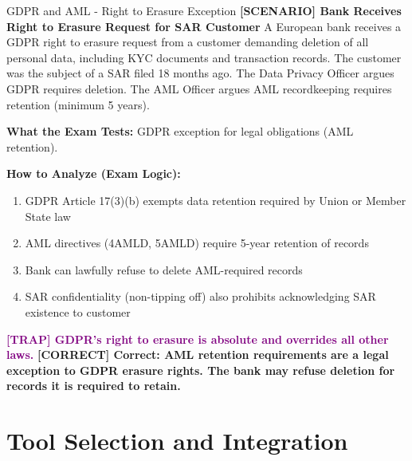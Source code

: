\documentclass[11pt,a4paper]{beamer}
\newcommand{\trap}[1]{\textcolor{purple}{\textbf{[TRAP] #1}}}
\newcommand{\correct}[1]{\textcolor{green!50!black}{\textbf{[CORRECT] #1}}}
\newcommand{\scenario}[1]{\textcolor{blue!70!black}{\textbf{[SCENARIO] #1}}}
\begin{document}
	\begin{frame}{GDPR and AML - Right to Erasure Exception}
		\scenario{Bank Receives Right to Erasure Request for SAR Customer}
		A European bank receives a GDPR right to erasure request from a customer demanding deletion of all personal data, including KYC documents and transaction records. The customer was the subject of a SAR filed 18 months ago. The Data Privacy Officer argues GDPR requires deletion. The AML Officer argues AML recordkeeping requires retention (minimum 5 years).
		
		\textbf{What the Exam Tests:} GDPR exception for legal obligations (AML retention).
		
		\textbf{How to Analyze (Exam Logic):}
		\begin{enumerate}
			\item GDPR Article 17(3)(b) exempts data retention required by Union or Member State law
			\item AML directives (4AMLD, 5AMLD) require 5-year retention of records
			\item Bank can lawfully refuse to delete AML-required records
			\item SAR confidentiality (non-tipping off) also prohibits acknowledging SAR existence to customer
		\end{enumerate}
		
		\trap{GDPR's right to erasure is absolute and overrides all other laws.}
		\correct{Correct: AML retention requirements are a legal exception to GDPR erasure rights. The bank may refuse deletion for records it is required to retain.}
	\end{frame}
	
	\section{Tool Selection and Integration}
	
\end{document}
